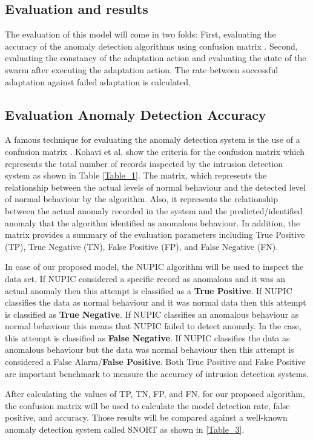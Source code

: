 \documentclass[sigconf]{acmart}
\begin{document}
\subsection{Evaluation and results} 
\label{sec:evaluation}
The evaluation of this model will come in two folds: First, evaluating the accuracy of the anomaly detection algorithms using confusion matrix \cite{kohavi1998confusion}.
Second, evaluating the constancy of the adaptation action and evaluating the state of the swarm after executing the adaptation action. The rate between successful adaptation against failed adaptation is calculated. 

\subsection{Evaluation Anomaly Detection Accuracy}
A famous technique for evaluating the anomaly detection system is the use of a confusion matrix \cite{kohavi1998confusion}. Kohavi et al. \cite{kohavi1998confusion} show the criteria for the confusion matrix which represents the total number of records inspected by the intrusion detection system as shown in Table \ref{Table_1}. The matrix, which represents the relationship between the actual levels of normal behaviour and the detected level of normal behaviour by the algorithm. Also, it represents the relationship between the actual anomaly recorded in the system and the predicted/identified anomaly that the algorithm identified as anomalous behaviour.  In addition, the matrix provides a summary of the evaluation parameters including True Positive (TP), True Negative (TN), False Positive (FP), and False Negative (FN).  
 
In case of our proposed model, the NUPIC algorithm will be used to inspect the data set. If NUPIC considered a specific record as anomalous and it was an actual anomaly then this attempt is classified as a \textbf{True Positive}. If NUPIC classifies the data as normal behaviour and it was normal data then this attempt is classified as \textbf{True Negative}. If NUPIC classifies an anomalous behaviour as normal behaviour this means that NUPIC failed to detect anomaly. In the case, this attempt is classified as \textbf{False Negative}. If NUPIC classifies the data as anomalous behaviour but the data was normal behaviour then this attempt is considered a False Alarm/\textbf{False Positive}. Both True Positive and False Positive are important benchmark to measure the accuracy of intrusion detection systems. 

After calculating the values of TP, TN, FP, and FN, for our proposed algorithm, the confusion matrix will be used to calculate the model detection rate, false positive, and accuracy. Those results will be compared against a well-known anomaly detection system called SNORT as shown in \ref{Table_3}.   
\end{document}
